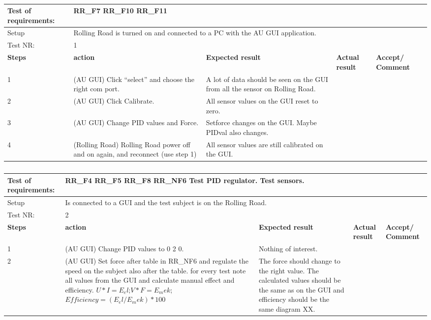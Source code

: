\begin{table}[h!]
	\centering
	\label{my-label}	
	\begin{tabular}{|p{1.5 cm}|p{4.2 cm}|p{2.1 cm}|p{2.1 cm}|p{2.1 cm}|}
		\hline
		Test of requirements: 
		& \multicolumn{4}{l|}{RR\_F7 RR\_F10 RR\_F11} \\ \hline
		Setup 
		& \multicolumn{4}{l|}{Rolling Road is turned on and connected to a PC with the AU GUI application.} \\ \hline
		Test NR:
		& \multicolumn{4}{l|}{1} \\ \hline
		\textbf{Steps} & \textbf{action} & \textbf{Expected result} & 
		\textbf{Actual result} & \textbf{Accept/ Comment} \\ \hline
		1 
		& (AU GUI) Click “select” and choose the right com port. 
		& A lot of data should be seen on the GUI from all the sensor on Rolling Road.
		&
		& \\ \hline
		2
		& (AU GUI) Click Calibrate.
		& All sensor values on the GUI reset to zero.
		&
		& \\ \hline
		3
		& (AU GUI) Change PID values and Force.
		& Setforce changes on the GUI. Maybe PIDval also changes.
		&
		& \\ \hline
		4
		& (Rolling Road) Rolling Road power off and on again, and reconnect (use step 1)
		& All sensor values are still calibrated on the GUI.
		&
		& \\ \hline
	\end{tabular}
	\caption{}
\end{table}


\begin{table}[h!]
	\centering
	\label{my-label}	
	\begin{tabular}{|p{1.5 cm}|p{4.2 cm}|p{2.1 cm}|p{2.1 cm}|p{2.1 cm}|}
		\hline
		Test of requirements: 
		& \multicolumn{4}{l|}{RR\_F4 RR\_F5 RR\_F8 RR\_NF6 Test PID regulator. Test sensors.} \\ \hline
		Setup 
		& \multicolumn{4}{l|}{Is connected to a GUI and the test subject is on the Rolling Road.} \\ \hline
		Test NR:
		& \multicolumn{4}{l|}{2} \\ \hline
		\textbf{Steps} & \textbf{action} & \textbf{Expected result} & 
		\textbf{Actual result} & \textbf{Accept/ Comment} \\ \hline
		1 
		& (AU GUI) Change PID values to 0 2 0. 
		& Nothing of interest.
		&
		& \\ \hline
		2
		& (AU GUI) Set force after table in RR\_NF6 and regulate the speed on the subject also after the table. for every test note all values from the GUI and calculate manual effect and efficiency. $ U*I=E_el $;$ V*F=E_mek $; $ Efficiency=(E_el/E_mek)*100 $
		& The force should change to the right value. The calculated values should be the same as on the GUI and efficiency should be the same diagram XX.
		&
		& \\ \hline
	\end{tabular}
	\caption{}
\end{table}

